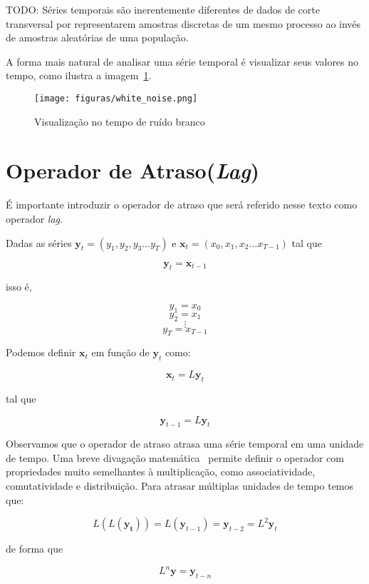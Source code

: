 TODO: Séries temporais são inerentemente diferentes de dados de corte
transversal por representarem amostras discretas de um mesmo processo ao invés
de amostras aleatórias de uma população.

A forma mais natural de analisar uma série temporal é visualizar seus valores
no tempo, como ilustra a imagem~\ref{fig:example}.

\begin{figure}[H]
    \centering
    \texttt{[image: figuras/white\_noise.png]}
    \caption{Visualização no tempo de ruído branco}
    \label{fig:example}
\end{figure}


\section{Operador de Atraso(\emph{Lag})}

É importante introduzir o operador de atraso que será referido nesse texto
como operador \emph{lag}.

Dadas as séries $\mathbf{y}_t = (y_1, y_2, y_3 \dots y_T)$ e
$\mathbf{x}_t = (x_0, x_1, x_2 \dots x_{T-1})$ tal que

$$ \mathbf{y}_t = \mathbf{x}_{t-1}$$

isso é,

$$ y_1 = x_0 $$
$$ y_2 = x_1 $$
$$ \vdots $$
$$ y_T = x_{T-1} $$

Podemos definir $\mathbf{x}_t$ em função de $\mathbf{y}_t$ como:

$$ \mathbf{x}_t = L\mathbf{y}_t $$

tal que

$$\boxed{\mathbf{y}_{t-1} = L\mathbf{y}_t}$$

Observamos que o operador de atraso atrasa uma série temporal em uma unidade
de tempo. Uma breve divagação matemática~\cite{hamilton} permite definir o
operador com propriedades muito semelhantes à multiplicação, como
associatividade, comutatividade e distribuição. Para atrasar múltiplas unidades
de tempo temos que:

\vspace{1cm}

$$L(L(\mathbf{y_t})) = L(\mathbf{y}_{t-1}) = \mathbf{y}_{t-2} = L^2 \mathbf{y}_{t}$$

\vspace{1cm}

de forma que

$$ L^n {\mathbf{y}} =  \mathbf{y}_{t-n}$$


